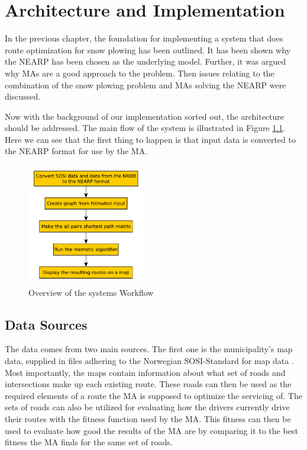 \chapter{Architecture and Implementation}
\label{architecture_and_implementation}

In the previous chapter, the foundation for implementing a system that does route optimization for snow plowing has been outlined. It has been shown why the NEARP has been chosen as the underlying model. Further, it was argued why MAs are a good approach to the problem. Then issues relating to the combination of the snow plowing problem and MAs solving the NEARP were discussed.

Now with the background of our implementation sorted out, the architecture should be addressed. The main flow of the system is illustrated in Figure \ref{fig:system_flowchart}. Here we can see that the first thing to happen is that input data is converted to the NEARP format \citep{NEARPdocumentationSINTEF} for use by the MA.

\begin{figure}
    \begin{center}
        \includegraphics[width=0.46\textwidth]{figures/Architecture/Overal_system_workflow.pdf}
    \end{center}
    \caption{Overview of the systems Workflow}
    \label{fig:system_flowchart}
\end{figure}

\section{Data Sources} %
\label{sec:data_sources}


The data comes from two main sources. The first one is the municipality's map data, supplied in files adhering to the Norwegian SOSI-Standard for map data \citep{kartverketSOSI}. Most importantly, the maps contain information about what set of roads and intersections make up each existing route. These roads can then be used as the required elements of a route the MA is supposed to optimize the servicing of. The sets of roads can also be utilized for evaluating how the drivers currently drive their routes with the fitness function used by the MA. This fitness can then be used to evaluate how good the results of the MA are by comparing it to the best fitness the MA finds for the same set of roads.

